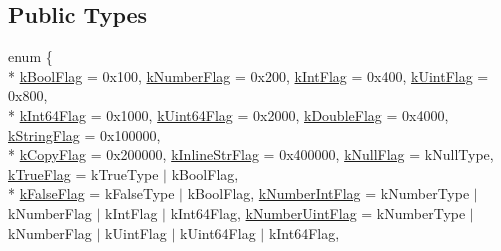 \subsection*{Public Types}
\begin{DoxyCompactItemize}
\item 
enum \{ \\*
\hyperlink{classGenericValue_aacdfd9d0f85a6161380a134e6d0c9d3cac48966386b231124da7c3fb870e237ee}{k\+Bool\+Flag} = 0x100, 
\hyperlink{classGenericValue_aacdfd9d0f85a6161380a134e6d0c9d3caa4776df2584fe4f341b183cdf3e00a79}{k\+Number\+Flag} = 0x200, 
\hyperlink{classGenericValue_aacdfd9d0f85a6161380a134e6d0c9d3cae3fb211193e0067efaddeb5a067120fb}{k\+Int\+Flag} = 0x400, 
\hyperlink{classGenericValue_aacdfd9d0f85a6161380a134e6d0c9d3ca7eba561e6cc6dcd704f907c5a005f3ce}{k\+Uint\+Flag} = 0x800, 
\\*
\hyperlink{classGenericValue_aacdfd9d0f85a6161380a134e6d0c9d3ca87c567a71dfa5a63363d82d32346884a}{k\+Int64\+Flag} = 0x1000, 
\hyperlink{classGenericValue_aacdfd9d0f85a6161380a134e6d0c9d3cac9200c78f749b6efaae640167a370c94}{k\+Uint64\+Flag} = 0x2000, 
\hyperlink{classGenericValue_aacdfd9d0f85a6161380a134e6d0c9d3ca70c741e7c488835892aa857f50090d7c}{k\+Double\+Flag} = 0x4000, 
\hyperlink{classGenericValue_aacdfd9d0f85a6161380a134e6d0c9d3caf3bf3661275a38c86addba900c52dccb}{k\+String\+Flag} = 0x100000, 
\\*
\hyperlink{classGenericValue_aacdfd9d0f85a6161380a134e6d0c9d3ca10ef921aef1773bc1f88796bf1828f92}{k\+Copy\+Flag} = 0x200000, 
\hyperlink{classGenericValue_aacdfd9d0f85a6161380a134e6d0c9d3cae58a76d504c6a67566aebfa4a6bd2e55}{k\+Inline\+Str\+Flag} = 0x400000, 
\hyperlink{classGenericValue_aacdfd9d0f85a6161380a134e6d0c9d3ca8c5507cf143edac6e50abec2d89cc40d}{k\+Null\+Flag} = k\+Null\+Type, 
\hyperlink{classGenericValue_aacdfd9d0f85a6161380a134e6d0c9d3ca75dbcdbacc82f9379c602f0b6c41cf07}{k\+True\+Flag} = k\+True\+Type $\vert$ k\+Bool\+Flag, 
\\*
\hyperlink{classGenericValue_aacdfd9d0f85a6161380a134e6d0c9d3ca66d3877b074bb1a0455a6f6d3f7f91a3}{k\+False\+Flag} = k\+False\+Type $\vert$ k\+Bool\+Flag, 
\hyperlink{classGenericValue_aacdfd9d0f85a6161380a134e6d0c9d3cacfe8b720220d0a2e378683367386cbaf}{k\+Number\+Int\+Flag} = k\+Number\+Type $\vert$ k\+Number\+Flag $\vert$ k\+Int\+Flag $\vert$ k\+Int64\+Flag, 
\hyperlink{classGenericValue_aacdfd9d0f85a6161380a134e6d0c9d3cae8c6c6286edf9c309e77af0ea0cf039c}{k\+Number\+Uint\+Flag} = k\+Number\+Type $\vert$ k\+Number\+Flag $\vert$ k\+Uint\+Flag $\vert$ k\+Uint64\+Flag $\vert$ k\+Int64\+Flag, 

\end{DoxyCompactItemize}
